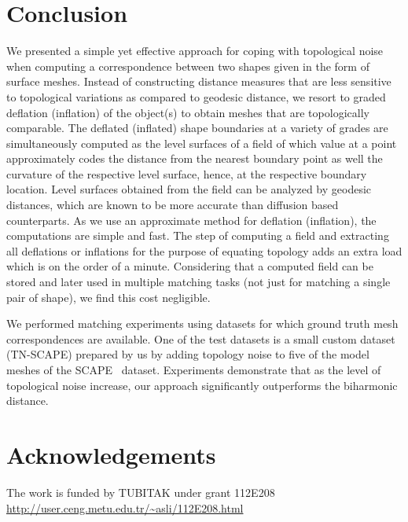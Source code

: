 \documentclass{egpubl}
\begin{document}
\vspace{-0.2cm}

\section{Conclusion}

We presented a simple yet effective approach for coping with topological noise when computing a correspondence between two shapes given in the form of surface meshes. Instead of constructing distance measures that are less sensitive to topological variations as compared to geodesic distance, we resort to graded deflation (inflation) of the object(s) to obtain meshes that are topologically comparable.  The deflated (inflated) shape boundaries at a variety of grades are simultaneously computed as the level surfaces of a field of which value at a point approximately codes the distance from the nearest boundary point as well the curvature of the respective level surface, hence, at the respective boundary location. Level surfaces obtained from the field can be analyzed by geodesic distances, which are known to be more accurate than diffusion based counterparts. As we use an approximate method for deflation (inflation), the computations are simple and fast. The step of computing a field and extracting all deflations or inflations for the purpose of equating topology adds an extra load which is on the order of a minute.  Considering that a computed field can be stored and later used in multiple matching tasks (not just for matching a single pair of shape), we find this cost negligible.

We  performed matching experiments using datasets for which ground truth mesh correspondences are available.  One of the test datasets is a small custom dataset (TN-SCAPE) prepared by us by adding topology noise to five of the model meshes of the SCAPE~\cite{anguelov2005scape} dataset. Experiments demonstrate that as the level of topological noise increase, our approach significantly outperforms the biharmonic distance.

\vspace{-0.3cm}

\section*{Acknowledgements} The work is funded by TUBITAK under grant 112E208 \url{http://user.ceng.metu.edu.tr/~asli/112E208.html}
\end{document}
